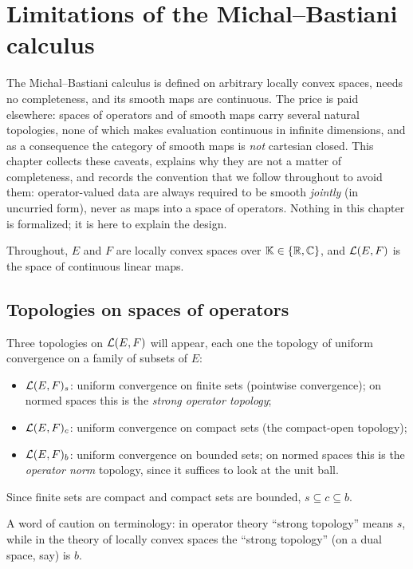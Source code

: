 \chapter{Limitations of the Michal--Bastiani calculus}
\label{chap:limitations}

The Michal--Bastiani calculus is defined on arbitrary locally convex spaces, needs no
completeness, and its smooth maps are continuous. The price is paid elsewhere: spaces of
operators and of smooth maps carry several natural topologies, none of which makes evaluation
continuous in infinite dimensions, and as a consequence the category of smooth maps is
\emph{not} cartesian closed. This chapter collects these caveats, explains why they are not a
matter of completeness, and records the convention that we follow throughout to avoid them:
operator-valued data are always required to be smooth \emph{jointly} (in uncurried form), never
as maps into a space of operators. Nothing in this chapter is formalized; it is here to explain
the design.

Throughout, $E$ and $F$ are locally convex spaces over $\mathbb{K} \in \{\mathbb{R}, \mathbb{C}\}$, and
$\mathcal{L}(E, F)$ is the space of continuous linear maps.

\section{Topologies on spaces of operators}

Three topologies on $\mathcal{L}(E, F)$ will appear, each one the topology of uniform convergence on
a family of subsets of $E$:
\begin{itemize}
  \item $\mathcal{L}(E, F)_s$: uniform convergence on finite sets (pointwise convergence); on normed
    spaces this is the \emph{strong operator topology};
  \item $\mathcal{L}(E, F)_c$: uniform convergence on compact sets (the compact-open topology);
  \item $\mathcal{L}(E, F)_b$: uniform convergence on bounded sets; on normed spaces this is the
    \emph{operator norm} topology, since it suffices to look at the unit ball.
\end{itemize}
Since finite sets are compact and compact sets are bounded, $s \subseteq c \subseteq b$.

A word of caution on terminology: in operator theory ``strong topology'' means $s$, while in
the theory of locally convex spaces the ``strong topology'' (on a dual space, say) is $b$.

